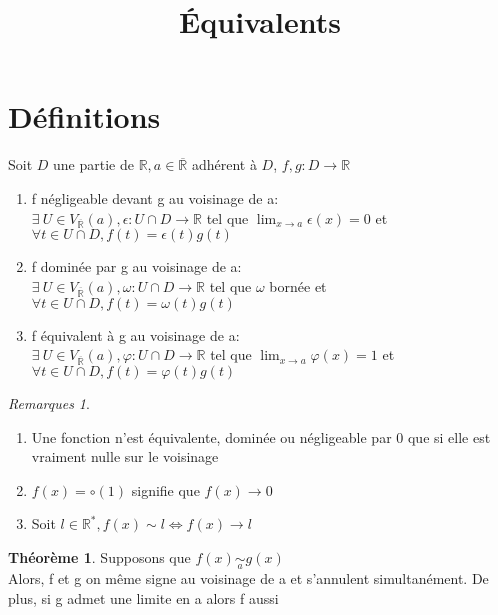 \documentclass[fleqn]{article}
\title{\'Equivalents}
\date{}
\theoremstyle{definition} \newtheorem*{defi}{D\'efinition}
\theoremstyle{definition} \newtheorem*{theo}{Th\'eor\`eme}
\theoremstyle{remark} \newtheorem*{rqs}{Remarques}
\begin{document}
\maketitle

\section{D\'efinitions}
Soit $D$ une partie de $\mathbb{R}, a \in \overline{\mathbb{R}}$ adh\'erent \`a $D$, $f,g: D \rightarrow \mathbb{R}$
\begin{enumerate}
	\item f n\'egligeable devant g au voisinage de a: \\
		$\exists\ U \in V_{\overline{\mathbb{R}}}(a), \epsilon: U \cap D \rightarrow \mathbb{R}$ tel que $\lim_{x \to a}\epsilon(x) = 0$ et
		$\forall t \in U \cap D, f(t)=\epsilon(t)g(t)$
	\item f domin\'ee par g au voisinage de a: \\
		$\exists\ U \in V_{\overline{\mathbb{R}}}(a), \omega: U \cap D \rightarrow \mathbb{R}$ tel que $\omega$ born\'ee et
		$\forall t \in U \cap D, f(t)=\omega(t)g(t)$
	\item f \'equivalent \`a g au voisinage de a: \\
		$\exists\ U \in V_{\overline{\mathbb{R}}}(a), \varphi: U \cap D \rightarrow \mathbb{R}$ tel que $\lim_{x \to a}\varphi(x) = 1$ et
		$\forall t \in U \cap D, f(t)=\varphi(t)g(t)$
\end{enumerate}

\begin{rqs} $ $
	\begin{enumerate}
		\item Une fonction n'est \'equivalente, domin\'ee ou n\'egligeable par 0 que si elle est vraiment nulle sur le voisinage
		\item $f(x) = \circ(1)$ signifie que $f(x) \rightarrow 0$
		\item Soit $l \in \mathbb{R}^{*}, f(x) \sim l \Leftrightarrow f(x) \rightarrow l$
	\end{enumerate}
\end{rqs}

\begin{theo}
	Supposons que $f(x)\underset{a}{\sim} g(x)$\\
	Alors, f et g on m\^eme signe au voisinage de a et s'annulent simultan\'ement. De plus, si g admet une limite en a alors f aussi
\end{theo}
\end{document}
